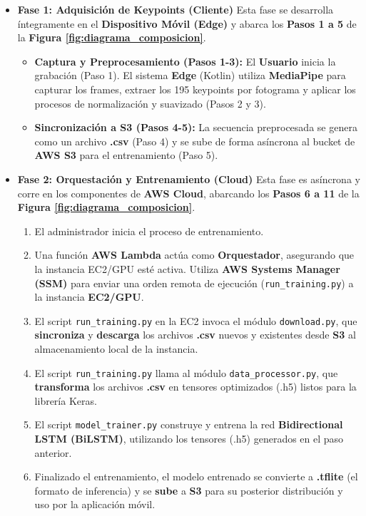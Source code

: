 \begin{itemize}
    \item \textbf{Fase 1: Adquisición de Keypoints (Cliente)}
    Esta fase se desarrolla íntegramente en el \textbf{Dispositivo Móvil (Edge)} y abarca los \textbf{Pasos 1 a 5} de la \textbf{Figura \ref{fig:diagrama_composicion}}.
    \begin{itemize}
        \item \textbf{Captura y Preprocesamiento (Pasos 1-3):} El \textbf{Usuario} inicia la grabación (Paso 1). El sistema \textbf{Edge} (Kotlin) utiliza \textbf{MediaPipe} para capturar los frames, extraer los 195 keypoints por fotograma y aplicar los procesos de normalización y suavizado (Pasos 2 y 3).
        \item \textbf{Sincronización a S3 (Pasos 4-5):} La secuencia preprocesada se genera como un archivo \textbf{.csv} (Paso 4) y se sube de forma asíncrona al bucket de \textbf{AWS S3} para el entrenamiento (Paso 5).
    \end{itemize}

    \item \textbf{Fase 2: Orquestación y Entrenamiento (Cloud)}
    Esta fase es asíncrona y corre en los componentes de \textbf{AWS Cloud}, abarcando los \textbf{Pasos 6 a 11} de la \textbf{Figura \ref{fig:diagrama_composicion}}.

    \begin{enumerate}
        \item[\textbf{Paso 6:}] El administrador inicia el proceso de entrenamiento.
        \item[\textbf{Paso 7:}] Una función \textbf{AWS Lambda} actúa como \textbf{Orquestador}, asegurando que la instancia EC2/GPU esté activa. Utiliza \textbf{AWS Systems Manager (SSM)} para enviar una orden remota de ejecución (\texttt{run\_training.py}) a la instancia \textbf{EC2/GPU}.
        \item[\textbf{Paso 8:}] El script \texttt{run\_training.py} en la EC2 invoca el módulo \texttt{download.py}, que \textbf{sincroniza} y \textbf{descarga} los archivos \textbf{.csv} nuevos y existentes desde \textbf{S3} al almacenamiento local de la instancia.
        \item[\textbf{Paso 9:}] El script \texttt{run\_training.py} llama al módulo \texttt{data\_processor.py}, que \textbf{transforma} los archivos \textbf{.csv} en tensores optimizados (.h5) listos para la librería Keras.
        \item[\textbf{Paso 10:}] El script \texttt{model\_trainer.py} construye y entrena la red \textbf{Bidirectional LSTM (BiLSTM)}, utilizando los tensores (.h5) generados en el paso anterior.
        \item[\textbf{Paso 11:}] Finalizado el entrenamiento, el modelo entrenado se convierte a \textbf{.tflite} (el formato de inferencia) y se \textbf{sube} a \textbf{S3} para su posterior distribución y uso por la aplicación móvil.
    \end{enumerate}

\end{itemize}

